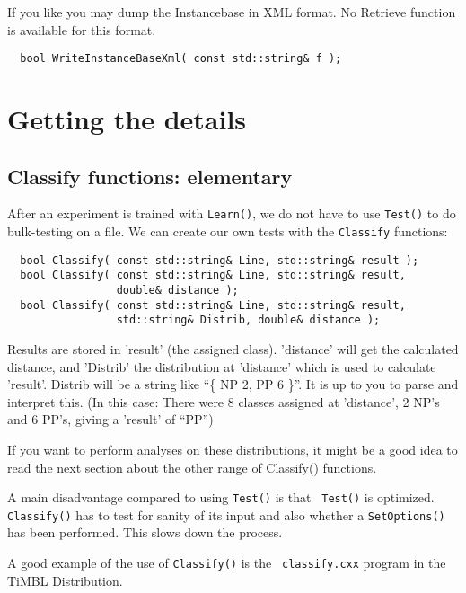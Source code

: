 \documentclass{report}
\begin{document}
If you like you may dump the Instancebase in XML format. No Retrieve
function is available for this format.

\begin{footnotesize}
\begin{verbatim}
  bool WriteInstanceBaseXml( const std::string& f );
\end{verbatim}
\end{footnotesize}

\chapter{Getting the details}

\section{Classify functions: elementary}
After an experiment is trained with {\tt Learn()}, we do not have to use
{\tt Test()} to do bulk-testing on a file.
We can create our own tests with the {\tt Classify} functions:

\begin{footnotesize}
\begin{verbatim}
  bool Classify( const std::string& Line, std::string& result );
  bool Classify( const std::string& Line, std::string& result, 
                 double& distance );
  bool Classify( const std::string& Line, std::string& result,
                 std::string& Distrib, double& distance );
\end{verbatim}
\end{footnotesize}

Results are stored in 'result' (the assigned class). 'distance' will
get the calculated distance, and 'Distrib' the distribution at
'distance' which is used to calculate 'result'.  Distrib will be a
string like ``\{ NP 2, PP 6 \}''. It is up to you to parse and
interpret this. (In this case: There were 8 classes assigned at
'distance', 2 NP's and 6 PP's, giving a 'result' of ``PP'')

If you want to perform analyses on these distributions, it might be a
good idea to read the next section about the other range of Classify()
functions.

A main disadvantage compared to using {\tt Test()} is that {\tt
  Test()} is optimized.  {\tt Classify()} has to test for sanity of
its input and also whether a {\tt SetOptions()} has been
performed. This slows down the process.

A good example of the use of {\tt Classify()} is the {\tt
 classify.cxx} program in the TiMBL Distribution.
\end{document}
